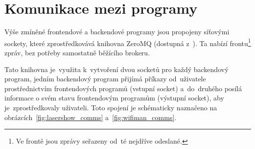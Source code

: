 \section{Komunikace mezi programy}\label{sec:comms}
Výše zmíněné frontendové a backendové programy jsou propojeny síťovými sockety, které zprostředkovává knihovna ZeroMQ (dostupná z~\cite{zeromq}). Ta nabízí frontu\footnote{Ve frontě jsou zprávy seřazeny od~té nejdříve odeslané.} zpráv, bez potřeby samostatně běžícího brokeru.

Tato knihovna je~využita k~vytvoření dvou socketů pro každý backendový program, jedním backendový program přijímá příkazy od~uživatele prostřednictvím frontendových programů (vstupní socket) a~do~druhého posílá informace o svém stavu frontendovým programům (výstupní socket), aby je~zprostředkovaly uživateli. Toto spojení je schématicky naznačeno na obrázcích~\ref{fig:lasershow_comms} a~\ref{fig:wifiman_comms}.


